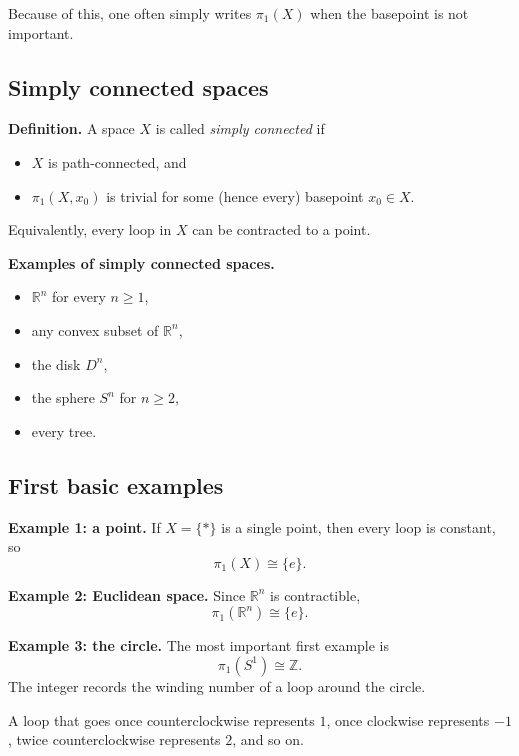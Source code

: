\documentclass[12pt,a4paper]{article}
\theoremstyle{notespace}
\begin{document}
Because of this, one often simply writes \(\pi_1(X)\) when the basepoint is not important.

\subsection{Simply connected spaces}

\textbf{Definition.}
A space \(X\) is called \emph{simply connected} if
\begin{itemize}
	\item \(X\) is path-connected, and
	\item \(\pi_1(X,x_0)\) is trivial for some (hence every) basepoint \(x_0\in X\).
\end{itemize}

Equivalently, every loop in \(X\) can be contracted to a point.

\medskip

\textbf{Examples of simply connected spaces.}
\begin{itemize}
	\item \(\mathbb R^n\) for every \(n\ge 1\),
	\item any convex subset of \(\mathbb R^n\),
	\item the disk \(D^n\),
	\item the sphere \(S^n\) for \(n\ge 2\),
	\item every tree.
\end{itemize}

\subsection{First basic examples}

\textbf{Example 1: a point.}
If \(X=\{\ast\}\) is a single point, then every loop is constant, so
\[
\pi_1(X)\cong \{e\}.
\]

\medskip

\textbf{Example 2: Euclidean space.}
Since \(\mathbb R^n\) is contractible,
\[
\pi_1(\mathbb R^n)\cong \{e\}.
\]

\medskip

\textbf{Example 3: the circle.}
The most important first example is
\[
\pi_1(S^1)\cong \mathbb Z.
\]
The integer records the winding number of a loop around the circle.

A loop that goes once counterclockwise represents \(1\), once clockwise represents \(-1\), twice counterclockwise represents \(2\), and so on.

\medskip
\end{document}
